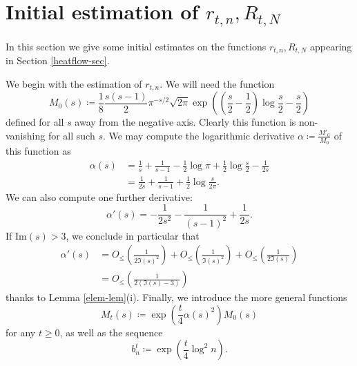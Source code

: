 \section{Initial estimation of $r_{t,n}, R_{t,N}$}

In this section we give some initial estimates on the functions $r_{t,n}, R_{t,N}$ appearing in Section \ref{heatflow-sec}.  

We begin with the estimation of $r_{t,n}$.  We will need the function
\begin{equation}\label{M-def}
 M_0(s) \coloneqq \frac{1}{8} \frac{s(s-1)}{2} \pi^{-s/2} \sqrt{2\pi} \exp\left( \left(\frac{s}{2}-\frac{1}{2}\right)\log \frac{s}{2} - \frac{s}{2} \right)
\end{equation}
defined for all $s$ away from the negative axis.  Clearly this function is non-vanishing for all such $s$.  We may compute the logarithmic derivative $\alpha \coloneqq \frac{M'_0}{M_0}$ of this function as
\begin{equation}\label{alpha-form}
\begin{split}
 \alpha(s) &= \frac{1}{s} + \frac{1}{s-1} - \frac{1}{2} \log \pi + \frac{1}{2} \log \frac{s}{2} - \frac{1}{2s} \\
&= \frac{1}{2s} + \frac{1}{s-1} + \frac{1}{2} \log \frac{s}{2\pi}.
\end{split}
\end{equation}
We can also compute one further derivative:
\begin{equation}\label{alpha-deriv}
 \alpha'(s) = -\frac{1}{2s^2} - \frac{1}{(s-1)^2} + \frac{1}{2 s}.
\end{equation}
If $\mathrm{Im}(s) > 3$, we conclude in particular that
\begin{equation}\label{alpha-deriv-bound}
\begin{split}
 \alpha'(s) &= O_{\leq}\left( \frac{1}{2\Im(s)^2} \right) + O_{\leq}\left( \frac{1}{\Im(s)^2} \right) + O_{\leq}\left( \frac{1}{2\Im(s)} \right) \\
 &= O_{\leq}\left( \frac{1}{2(\Im(s)-3)} \right)
\end{split}
\end{equation}
thanks to Lemma \ref{elem-lem}(i).  Finally, we introduce the more general functions
\begin{equation}\label{Mt-def}
M_t(s) \coloneqq \exp( \frac{t}{4} \alpha(s)^2 ) M_0(s)
\end{equation}
for any $t \geq 0$, as well as the sequence
\begin{equation}\label{bn-def}
b_n^t \coloneqq \exp( \frac{t}{4} \log^2 n ).
\end{equation}

